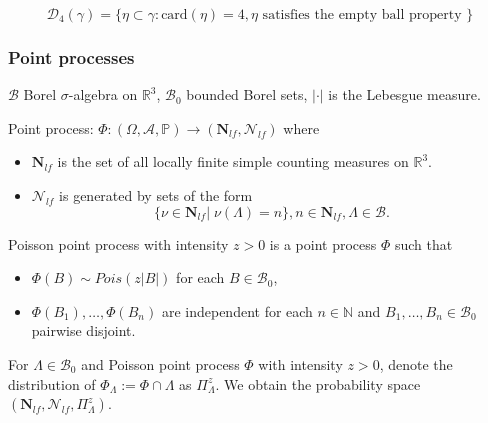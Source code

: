 \documentclass[c, 10pt]{beamer}
\begin{document}
\begin{frame}
\begin{center}
\end{center}


$$\mathcal D_4(\gamma) = \{ \eta \subset \gamma: \mathrm{card}(\eta)=4, \eta \text{ satisfies the empty ball property } \}$$




\end{frame}



\begin{frame}\frametitle{Point processes}

	$\mathcal B$ Borel $\sigma$-algebra on $\mathbb R^3$, $\mathcal B_0$ bounded Borel sets, $|\cdot|$ is the Lebesgue measure. \noindent

	\alert{Point process}: $\Phi: (\Omega, \mathcal A, \mathbb P) \to (\mathbf N_{lf}, \mathcal N_{lf})$ where 
\begin{itemize}
	\item $\mathbf N_{lf}$ is the set of all locally finite simple counting measures on $\mathbb R^3$.
	\item $\mathcal N_{lf}$ is generated by sets of the form $$\{\nu \in \mathbf N_{lf} | \; \nu(\Lambda) = n \}, n \in \mathbf N_{lf}, \Lambda \in \mathcal B.$$
\end{itemize}

\pause 
\alert{Poisson point process} with intensity $z>0$ is a point process $\Phi$ such that
\begin{itemize}
    \item $\Phi(B) \sim Pois(z|B|)$ for each $B \in \mathcal B_0$,
    \item $\Phi(B_1), \dots, \Phi(B_n)$ are independent for each $n \in \mathbb N$ and $B_1,\dots, B_n \in \mathcal B_0$ pairwise disjoint.
\end{itemize}

\vspace{5mm} 
\pause
For $\Lambda \in \mathcal B_0$ and Poisson point process $\Phi$ with intensity $z>0$, denote the distribution of $\Phi_\Lambda := \Phi \cap \Lambda$ as \alert{$\Pi_\Lambda^z$}. \newline
We obtain the probability space $(\mathbf N_{lf}, \mathcal N_{lf}, \Pi^z_\Lambda)$.


\end{frame}
\end{document}
